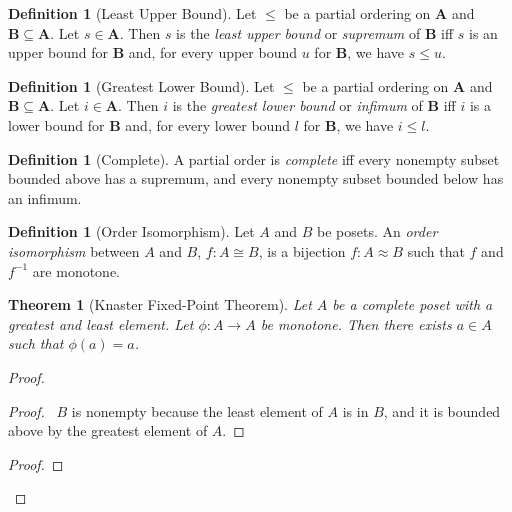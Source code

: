 \documentclass{book}
\let\qed\relax
\newtheorem{thm}[ax]{Theorem}
\theoremstyle{definition}
\newtheorem{df}[ax]{Definition}
\begin{document}
\begin{df}[Least Upper Bound]
Let $\leq$ be a partial ordering on $\mathbf{A}$ and $\mathbf{B} \subseteq \mathbf{A}$. Let $s \in \mathbf{A}$. Then $s$ is the \emph{least upper bound} or \emph{supremum} of $\mathbf{B}$ iff $s$ is an upper bound for $\mathbf{B}$ and, for every upper bound $u$ for $\mathbf{B}$, we have $s \leq u$.
\end{df}

\begin{df}[Greatest Lower Bound]
Let $\leq$ be a partial ordering on $\mathbf{A}$ and $\mathbf{B} \subseteq \mathbf{A}$. Let $i \in \mathbf{A}$. Then $i$ is the \emph{greatest lower bound} or \emph{infimum} of $\mathbf{B}$ iff $i$ is a lower bound for $\mathbf{B}$ and, for every lower bound $l$ for $\mathbf{B}$, we have $i \leq l$.
\end{df}

\begin{df}[Complete]
A partial order is \emph{complete} iff every nonempty subset bounded above has a supremum, and every nonempty subset bounded below has an infimum.
\end{df}

\begin{df}[Order Isomorphism]
Let $A$ and $B$ be posets. An \emph{order isomorphism} between $A$ and $B$, $f : A \cong B$, is a bijection $f : A \approx B$ such that $f$ and $f^{-1}$ are monotone.
\end{df}
	
\begin{thm}[Knaster Fixed-Point Theorem]
Let $A$ be a complete poset with a greatest and least element. Let $\phi : A \rightarrow A$ be monotone. Then there exists $a \in A$ such that $\phi(a) = a$.
\end{thm}

\begin{proof}
\pf
{}
\begin{proof}
	\pf\ $B$ is nonempty because the least element of $A$ is in $B$, and it is bounded above by the greatest element of $A$.
\end{proof}
\begin{proof}
\end{proof}
\qed
\end{proof}
\end{document}
